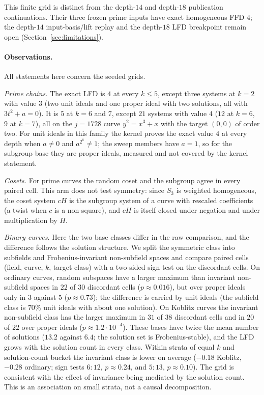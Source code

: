 \documentclass[11pt]{article}
\theoremstyle{definition}\newtheorem{definition}[theorem]{Definition}
\theoremstyle{remark}\newtheorem{remark}[theorem]{Remark}
\begin{document}
This finite grid is distinct from the depth-$14$ and depth-$18$
publication continuations. Their three frozen prime inputs have exact
homogeneous FFD $4$; the depth-$14$ input-basis/lift replay and the
depth-$18$ LFD breakpoint remain open (Section~\ref{sec:limitations}).

\paragraph{Observations.}
All statements here concern the seeded grids.

\emph{Prime chains.} The exact LFD is $4$ at every $k\le5$, except three
systems at $k=2$ with value $3$ (two unit ideals and one proper ideal with
two solutions, all with $3t^2+a=0$). It is $5$ at $k=6$ and $7$, except
$21$ systems with value $4$ ($12$ at $k=6$, $9$ at $k=7$), all on the
$j=1728$ curve $y^2=x^3+x$ with the target $(0,0)$ of order two. For unit
ideals in this family the kernel proves the exact value $4$ at every depth
when $a\ne0$ and $a^{2^k}\ne1$; the sweep members have $a=1$, so for the
subgroup base they are proper ideals, measured and not covered by the
kernel statement.

\emph{Cosets.} For prime curves the random coset and the subgroup agree in
every paired cell. This arm does not test symmetry: since $S_3$ is weighted
homogeneous, the coset system $cH$ is the subgroup system of a curve with
rescaled coefficients (a twist when $c$ is a non-square), and $cH$ is itself
closed under negation and under multiplication by $H$.

\emph{Binary curves.} Here the two base classes differ in the raw
comparison, and the difference follows the solution structure. We split the
symmetric class into subfields and Frobenius-invariant non-subfield spaces
and compare paired cells (field, curve, $k$, target class) with a two-sided
sign test on the discordant cells. On ordinary curves, random subspaces
have a larger maximum than invariant non-subfield spaces in $22$ of $30$
discordant cells ($p\approx0.016$), but over proper ideals only in $3$
against $5$ ($p\approx0.73$); the difference is carried by unit ideals (the
subfield class is $70\%$ unit ideals with about one solution). On Koblitz
curves the invariant non-subfield class has the larger maximum in $31$ of
$38$ discordant cells and in $20$ of $22$ over proper ideals
($p\approx1.2\cdot10^{-4}$). These bases have twice the mean number of
solutions ($13.2$ against $6.4$; the solution set is Frobenius-stable), and
the LFD grows with the solution count in every class. Within strata of
equal $k$ and solution-count bucket the invariant class is lower on average
($-0.18$ Koblitz, $-0.28$ ordinary; sign tests $6{:}12$, $p\approx0.24$,
and $5{:}13$, $p\approx0.10$). The grid is consistent with the effect of
invariance being mediated by the solution count. This is an association on
small strata, not a causal decomposition.
\end{document}
